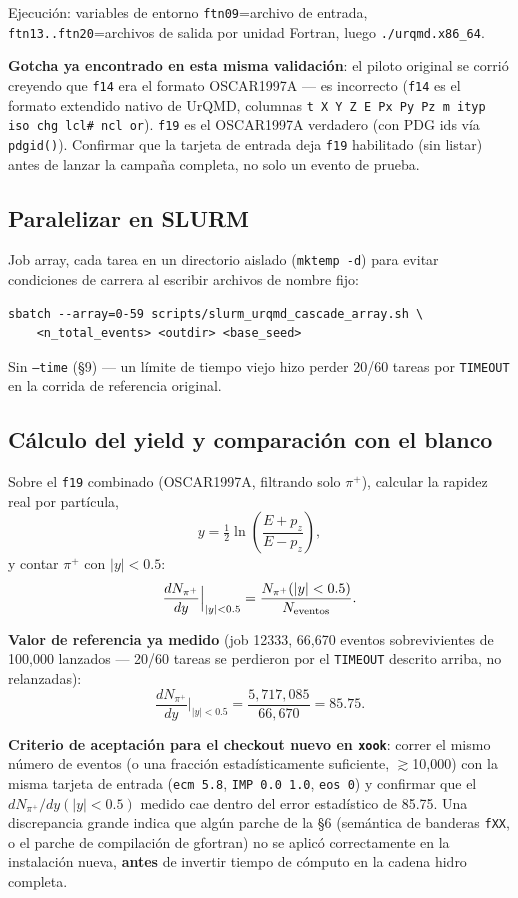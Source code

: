 \documentclass[11pt]{article}
\begin{document}
Ejecución: variables de entorno \texttt{ftn09}=archivo de entrada,
\texttt{ftn13..ftn20}=archivos de salida por unidad Fortran, luego
\texttt{./urqmd.x86\_64}.

\textbf{Gotcha ya encontrado en esta misma validación}: el piloto original
se corrió creyendo que \texttt{f14} era el formato OSCAR1997A --- es
incorrecto (\texttt{f14} es el formato extendido nativo de UrQMD, columnas
\texttt{t X Y Z E Px Py Pz m ityp iso chg lcl\# ncl or}). \texttt{f19} es
el OSCAR1997A verdadero (con PDG ids vía \texttt{pdgid()}). Confirmar que
la tarjeta de entrada deja \texttt{f19} habilitado (sin listar) antes de
lanzar la campaña completa, no solo un evento de prueba.

\subsection{Paralelizar en SLURM}

Job array, cada tarea en un directorio aislado (\texttt{mktemp -d}) para
evitar condiciones de carrera al escribir archivos de nombre fijo:

\begin{Verbatim}[fontsize=\small]
sbatch --array=0-59 scripts/slurm_urqmd_cascade_array.sh \
    <n_total_events> <outdir> <base_seed>
\end{Verbatim}

Sin \texttt{--time} (\S9) --- un límite de tiempo viejo hizo perder 20/60
tareas por \texttt{TIMEOUT} en la corrida de referencia original.

\subsection{Cálculo del yield y comparación con el blanco}

Sobre el \texttt{f19} combinado (OSCAR1997A, filtrando solo $\pi^+$),
calcular la rapidez real por partícula,
\[
  y = \tfrac{1}{2}\ln\!\left(\frac{E+p_z}{E-p_z}\right),
\]
y contar $\pi^+$ con $|y|<0.5$:
\[
  \frac{dN_{\pi^+}}{dy}\Big|_{|y|<0.5} = \frac{N_{\pi^+}(|y|<0.5)}{N_{\rm eventos}}.
\]

\textbf{Valor de referencia ya medido} (job 12333, 66{,}670 eventos
sobrevivientes de 100{,}000 lanzados --- 20/60 tareas se perdieron por el
\texttt{TIMEOUT} descrito arriba, no relanzadas):
\[
  \frac{dN_{\pi^+}}{dy}\Big|_{|y|<0.5} = \frac{5{,}717{,}085}{66{,}670} = 85.75.
\]

\textbf{Criterio de aceptación para el checkout nuevo en \texttt{xook}}:
correr el mismo número de eventos (o una fracción estadísticamente
suficiente, $\gtrsim$10{,}000) con la misma tarjeta de entrada
(\texttt{ecm 5.8}, \texttt{IMP 0.0 1.0}, \texttt{eos 0}) y confirmar que el
$dN_{\pi^+}/dy(|y|<0.5)$ medido cae dentro del error estadístico de 85.75.
Una discrepancia grande indica que algún parche de la \S6 (semántica de
banderas \texttt{fXX}, o el parche de compilación de gfortran) no se aplicó
correctamente en la instalación nueva, \textbf{antes} de invertir tiempo de
cómputo en la cadena hidro completa.
\end{document}
